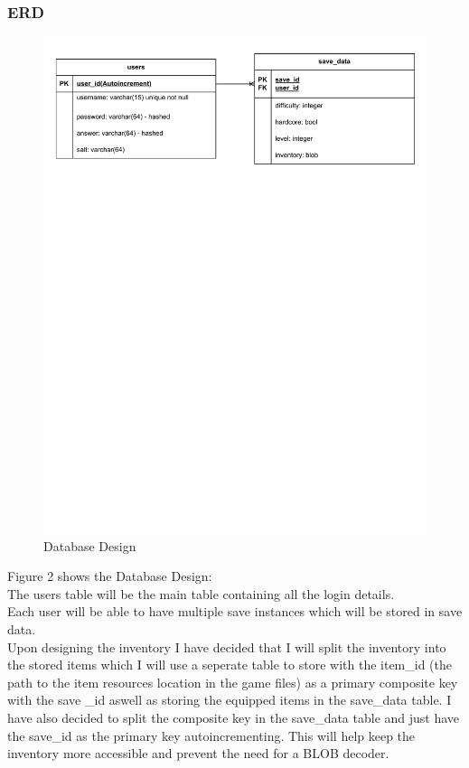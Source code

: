 \documentclass{article}
\begin{document}
        \subsubsection{ERD}
        \begin{figure}[H]
                \centering
                \includegraphics[width=\textwidth, trim = 0 575 0 25, clip]{images/design/Database_Design.pdf}
                \caption{Database Design}
        \end{figure}
        Figure 2 shows the Database Design:\\
        The users table will be the main table containing all the login details.\\
        Each user will be able to have multiple save instances which will be stored in save data.\\
        Upon designing the inventory I have decided that I will split the inventory into the stored items which I will use a seperate table to store with the item\_id (the path to the item resources location in the game files) as a primary composite key with the save \_id aswell as storing the equipped items in the save\_data table. I have also decided to split the composite key in the save\_data table and just have the save\_id as the primary key autoincrementing. This will help keep the inventory more accessible and prevent the need for a BLOB decoder.\\
\end{document}
